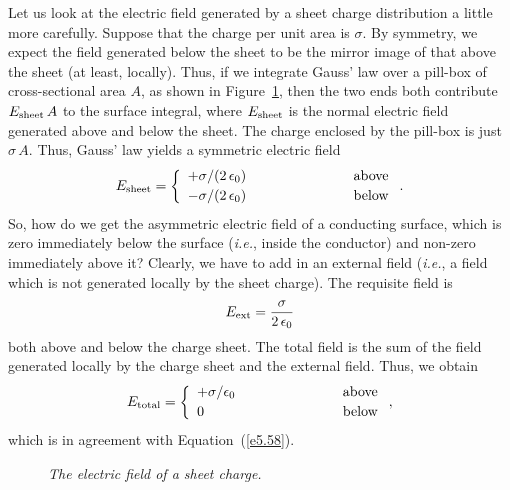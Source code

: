Let us look at the electric field generated by a sheet charge distribution
a little more carefully. Suppose that the  charge per unit area is $\sigma$.
By symmetry, we expect the field generated below the sheet to be the mirror image
of that above the sheet (at least, locally). Thus, if we integrate Gauss' law over
a pill-box of cross-sectional area $A$, as shown in Figure~\ref{f41}, then  the
two ends both contribute $E_{\rm sheet}\,A$ to the surface integral, where $E_{\rm
sheet}$ is the normal
electric field generated above and below the sheet. The charge enclosed 
by the pill-box is just $\sigma\,A$. Thus, Gauss' law yields
a symmetric electric field 
\begin{equation}\label{e5.49}
E_{\rm sheet}= \left\{
\begin{array}{lll}
+\sigma/(2\,\epsilon_0)& \mbox{\hspace{2cm}}&\mbox{above}\\[0.5ex] 
-\sigma/(2\,\epsilon_0)&\mbox{\hspace{2cm}}&\mbox{below}
\end{array}
\right..
\end{equation}
So, how do we get the asymmetric electric field of a conducting surface,
 which is zero immediately below the surface ({\em i.e.}, inside the conductor) and
non-zero immediately above it? Clearly, we have to add in an external field
({\em i.e.}, a field which is not generated locally by the sheet charge). 
The 
requisite field is
\begin{equation}
E_{\rm ext} = \frac{\sigma}{2\,\epsilon_0}
\end{equation}
both above and below the charge sheet. The total field is the sum of the field
generated locally by the charge sheet and the external field. Thus, we obtain
\begin{equation}
E_{\rm total}= \left\{
\begin{array}{lll}
+\sigma/\epsilon_0& \mbox{\hspace{2cm}}&\mbox{above}\\[0.5ex] 
0&\mbox{\hspace{2cm}}&\mbox{below}
\end{array}
\right.,\label{e5.50}
\end{equation}
which is in agreement with Equation~(\ref{e5.58}).
\begin{figure}
\centerline{}
\caption{\em The electric field of a sheet charge.}\label{f41}
\end{figure}

